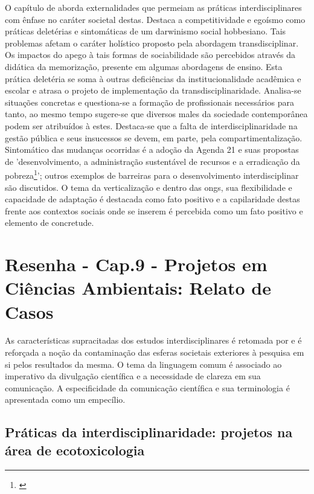 \documentclass[
   article,       %
   12pt,          %
   oneside,       %
   a4paper,       %
   english,       %
   brazil,           %
   sumario=tradicional
   ]{abntex2}
\begin{document}
O capítulo de \cite{Critica_Interdisciplinar} aborda externalidades que permeiam as práticas interdisciplinares com ênfase no caráter societal destas. Destaca a competitividade e egoísmo como práticas deletérias e sintomáticas de um darwinismo social hobbesiano. Tais problemas afetam o caráter holístico proposto pela abordagem transdisciplinar. Os impactos do apego à tais formas de sociabilidade são percebidos através da didática da memorização, presente em algumas abordagens de ensino. Esta prática deletéria se soma à outras deficiências da institucionalidade acadêmica e escolar e atrasa o projeto de implementação da transdisciplinaridade. Analisa-se situações concretas e questiona-se a formação de profissionais necessários para tanto, ao mesmo tempo sugere-se que diversos males da sociedade contemporânea podem ser atribuídos à estes. Destaca-se que a falta de interdisciplinaridade na gestão pública e seus insucessos se devem, em parte, pela compartimentalização. Sintomático das mudanças ocorridas é a adoção da Agenda 21 e suas propostas de 'desenvolvimento, a administração sustentável de recursos e a erradicação da pobreza\footnote{\cite[p.150]{Critica_Interdisciplinar}}'; outros exemplos de barreiras para o desenvolvimento interdisciplinar são discutidos. O tema da verticalização e dentro das ongs, sua flexibilidade e capacidade de adaptação é destacada como fato positivo e a capilaridade destas frente aos contextos sociais onde se inserem é percebida como um fato positivo e elemento de concretude.




\newpage

\section{Resenha - Cap.9 - Projetos em Ciências Ambientais: Relato de Casos}

As características supracitadas dos estudos interdisciplinares é retomada por \cite{Interdisciplinar_casos} e é reforçada a noção da contaminação das esferas societais exteriores à pesquisa em si pelos resultados da mesma. O tema da linguagem comum é associado ao imperativo da divulgação científica e a necessidade de clareza em sua comunicação. A especificidade da comunicação científica e sua terminologia é apresentada como um empecílio.


\subsection{Práticas da interdisciplinaridade: projetos na área de ecotoxicologia}
\end{document}
